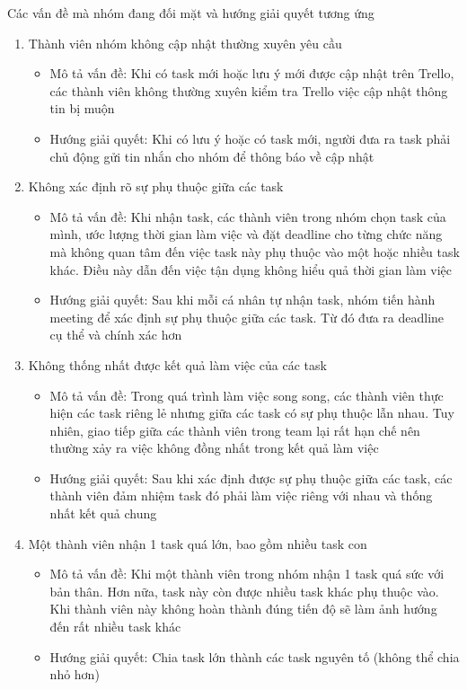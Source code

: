 \documentclass[a4paper, 12pt]{article}
\begin{document}
Các vấn đề mà nhóm đang đối mặt và hướng giải quyết tương ứng
\begin{enumerate}
    \item Thành viên nhóm không cập nhật thường xuyên yêu cầu
    \begin{itemize}
        \item Mô tả vấn đề: Khi có task mới hoặc lưu ý mới được cập nhật trên Trello, các thành viên không thường xuyên kiểm tra Trello việc cập nhật thông tin bị muộn
        \item Hướng giải quyết: Khi có lưu ý hoặc có task mới, người đưa ra task phải chủ động gửi tin nhắn cho nhóm để thông báo về cập nhật
    \end{itemize}

    \item Không xác định rõ sự phụ thuộc giữa các task
    \begin{itemize}
        \item Mô tả vấn đề: Khi nhận task, các thành viên trong nhóm chọn task của mình, ước lượng thời gian làm việc và đặt deadline cho từng chức năng mà không quan tâm đến việc task này phụ thuộc vào một hoặc nhiều task khác. Điều này dẫn đến việc tận dụng không hiểu quả thời gian làm việc
        \item Hướng giải quyết: Sau khi mỗi cá nhân tự nhận task, nhóm tiến hành meeting để xác định sự phụ thuộc giữa các task. Từ đó đưa ra deadline cụ thể và chính xác hơn
    \end{itemize}

    \item Không thống nhất được kết quả làm việc của các task 
    \begin{itemize}
        \item Mô tả vấn đề: Trong quá trình làm việc song song, các thành viên thực hiện các task riêng lẻ nhưng giữa các task có sự phụ thuộc lẫn nhau. Tuy nhiên, giao tiếp giữa các thành viên trong team lại rất hạn chế nên thường xảy ra việc không đồng nhất trong kết quả làm việc
        \item Hướng giải quyết: Sau khi xác định được sự phụ thuộc giữa các task, các thành viên đảm nhiệm task đó phải làm việc riêng với nhau và thống nhất kết quả chung
    \end{itemize}

    \item Một thành viên nhận 1 task quá lớn, bao gồm nhiều task con
    \begin{itemize}
        \item Mô tả vấn đề: Khi một thành viên trong nhóm nhận 1 task quá sức với bản thân. Hơn nữa, task này còn được nhiều task khác phụ thuộc vào. Khi thành viên này không hoàn thành đúng tiến độ sẽ làm ảnh hướng đến rất nhiều task khác
        \item Hướng giải quyết: Chia task lớn thành các task nguyên tố (không thể chia nhỏ hơn)
    \end{itemize}
\end{enumerate}
\end{document}
